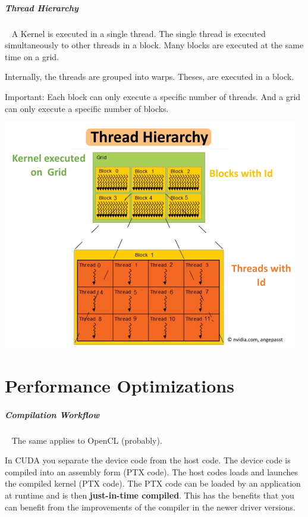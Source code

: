 \documentclass[11pt,twoside,landscape]{article}
\begin{document}
\begin{multicols}{3}
{{\subparagraph{Thread Hierarchy} \
\label{sec:org5a812a5}
A Kernel is executed in a single thread.
The single thread is executed simultaneously to other threads in a block.
Many blocks are executed at the same time on a grid.

Internally, the threads are grouped into warps.
Theses, are executed in a block.

Important: Each block can only execute a specific number of threads.
And a grid can only execute a specific number of blocks.


{
\begin{center}
\includegraphics[width=.9\linewidth]{img/thread_hierarchy.png}
\end{center}
\label{fig:thread-hierarchy-on-gpu}
}

\section{Performance Optimizations}
\label{sec:org25d465f}
\subparagraph{Compilation Workflow} \
\label{sec:orgf91f104}
The same applies to OpenCL (probably).

In CUDA you separate the device code from the host code.
The device code is compiled into an assembly form (PTX code).
The host codes loads and launches the compiled kernel (PTX code).
The PTX code can be loaded by an application at runtime and is then \textbf{just-in-time compiled}.
This has the benefits that you can benefit from the improvements of the compiler in the newer driver versions.

}}
\end{multicols}
\end{document}
